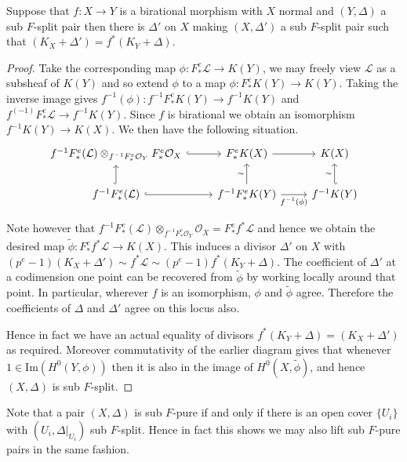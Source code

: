 \documentclass[a4paper,12pt]{book}
\newcommand{\Fe}[1][e]{F^{#1}_{*}}
\newcommand{\ox}[1][X]{\mathcal{O}_{#1}}
\begin{document}
\begin{lemma}\label{F-pullback}
	Suppose that $f:X \to Y$ is a birational morphism with $X$ normal and $(Y,\Delta)$ a sub $F$-split pair then there is $\Delta'$ on $X$ making $(X,\Delta')$ a sub $F$-split pair such that $(K_{X}+\Delta')=f^{*}(K_{Y}+\Delta)$.  
\end{lemma}
\begin{proof}
	
	Take the corresponding map $\phi: \Fe\mathcal{L} \to K(Y)$, we may freely view $\mathcal{L}$ as a subsheaf of $K(Y)$ and so extend $\phi$ to a map $\phi: \Fe K(Y) \to K(Y)$. Taking the inverse image gives $f^{-1}(\phi): f^{-1}\Fe K(Y) \to f^{-1}K(Y)$ and $f^(-1)\Fe \mathcal{L} \to f^{-1}K(Y)$. Since $f$ is birational we obtain an isomorphism $f^{-1}K(Y) \to K(X)$. We then have the following situation.
	\[\begin{tikzcd}
	f^{-1}\Fe(\mathcal{L}) \otimes_{f^{-1}\Fe\mathcal{O}_{Y}}\Fe\ox \arrow[r, hook] & \Fe K(X) \arrow[r]                                          & K(X)                                \\
	f^{-1}\Fe(\mathcal{L}) \arrow[r, hook] \arrow[u, hook]                       & f^{-1}\Fe K(Y) \arrow[r, "f^{-1}(\phi)"'] \arrow[u, "\sim"] & f^{-1}K(Y) \arrow[u, "\sim", hook']
	\end{tikzcd}\]
	
	Note however that $f^{-1}\Fe(\mathcal{L}) \otimes_{f^{-1}\Fe\mathcal{O}_{Y}}\ox= \Fe f^{*}\mathcal{L}$ and hence we obtain the desired map $\tilde{\phi}: \Fe f^{*}\mathcal{L} \to K(X)$. This induces a divisor $\Delta'$ on $X$ with $(p^{e}-1)(K_{X}+\Delta') \sim f^{*}\mathcal{L} \sim (p^{e}-1)f^{*}(K_{Y}+\Delta)$. The coefficient of $\Delta'$ at a codimension one point can be recovered from $\tilde{\phi}$ by working locally around that point. In particular, wherever $f$ is an isomorphism, $\phi$ and $\tilde{\phi}$ agree. Therefore the coefficients of $\Delta$ and $\Delta'$ agree on this locus also.
	
	Hence in fact we have an actual equality of divisors $f^{*}(K_{Y}+\Delta)=(K_{X}+\Delta')$ as required. Moreover commutativity of the earlier diagram gives that whenever $1 \in \text{Im}(H^{0}(Y,\phi))$ then it is also in the image of $H^{0}(X,\tilde{\phi})$, and hence $(X,\Delta)$ is sub $F$-split.
\end{proof}

Note that a pair $(X,\Delta)$ is sub $F$-pure if and only if there is an open cover $\{U_{i}\}$ with $(U_{i},\Delta|_{U_{i}})$ sub $F$-split. Hence in fact this shows we may also lift sub $F$-pure pairs in the same fashion. 
\end{document}
